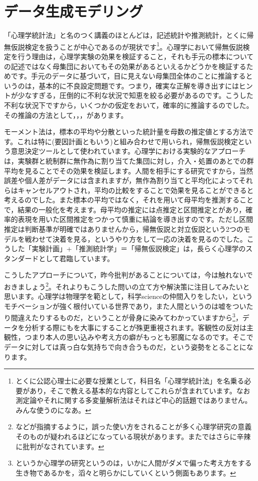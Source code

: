 \documentclass{ltjsbook}
\begin{document}
\section{データ生成モデリング}
「心理学統計法」と名のつく講義のほとんどは，記述統計や推測統計，とくに帰無仮説検定を扱うことが中心であるのが現状です\footnote{とくに公認心理士に必要な授業として，科目名「心理学統計法」を名乗る必要があり，そこで教える基本的な内容としてこれらが含まれています。なお測定論やそれに関する多変量解析法はそれほど中心的話題ではありません。みんな使うのになあ。}。心理学において帰無仮説検定を行う理由は，心理学実験の効果を検証すること，それも手元の標本についての記述ではなく母集団においてもその効果があるといえるかどうかを検証するためです。手元のデータに基づいて，目に見えない母集団全体のことに推論するというのは，基本的に不良設定問題です。つまり，確実な正解を導き出すにはヒントが少なすぎる，圧倒的に不利な状況で知恵を絞る必要があるのです。こうした不利な状況下ですから，いくつかの仮定をおいて，確率的に推論するのでした。その推論の方法として，，，があります。

モーメント法は，標本の平均や分散といった統計量を母数の推定値とする方法です。これは特に(要因計画ともいう)と組み合わせで用いられ，帰無仮説検定という意思決定ツールとして使われています。心理学における実験的なアプローチは，実験群と統制群に無作為に割り当てた集団に対し，介入・処置のあとでの群平均を見ることでその効果を検証します。人間を相手にする研究ですから，当然誤差や個人差がデータには含まれますが，無作為割り当てと平均化によってそれらはキャンセルアウトされ，平均の比較をすることで効果を見ることができると考えるのでした。また標本の平均ではなく，それを用いて母平均を推測することで，結果の一般化を考えます。母平均の推定には点推定と区間推定とがあり，確率的表現を用いた区間推定をつかって慎重に結論を導き出すのです。ただし区間推定は判断基準が明確ではありませんから，帰無仮説と対立仮説という2つのモデルを戦わせて決着を見る，というやり方をして一応の決着を見るのでした。こうした「実験計画」+「推測統計学」＝「帰無仮説検定」は，長らく心理学のスタンダードとして君臨しています。

こうしたアプローチについて，昨今批判があることについては，今は触れないでおきましょう\footnote{\citet{amrhein2019scientists}などが指摘するように，誤った使い方をされることが多く心理学研究の意義そのものが疑われるほどになっている現状があります。また\citet{Toyoda202003}ではさらに辛辣に批判がなされています。}。それよりもこうした問いの立て方や解決策に注目してみたいと思います。心理学は物理学を範として，科学scienceの仲間入りをしたい，というモチベーションが強く根付いている世界であり，また人間というのは嘘をついたり間違えたりするものだ，ということが骨身に染みてわかっていますから\footnote{というか心理学の研究というのは，いかに人間がダメで偏った考え方をする生き物であるかを，滔々と明らかにしていくという側面もあります。}，データを分析する際にもを大事にすることが殊更重視されます。客観性の反対は主観性，つまり本人の思い込みや考え方の癖がもっとも邪魔になるのです。そこでデータに対しては真っ白な気持ちで向き合うものだ，という姿勢をとることになります。
\end{document}
